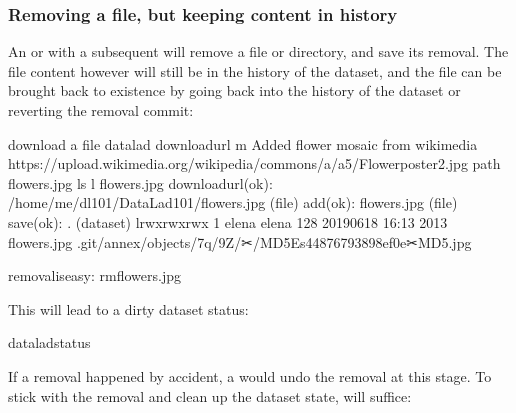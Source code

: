 \subsubsection{Removing a file, but keeping content in history}
\label{\detokenize{basics/101-136-filesystem:removing-a-file-but-keeping-content-in-history}}
\sphinxAtStartPar
An  or  with a subsequent 
will remove a file or directory, and save its removal. The file content however will
still be in the history of the dataset, and the file can be brought back to existence
by going back into the history of the dataset or reverting the removal commit:

\begin{sphinxVerbatim}[commandchars=\\\{\}]
\PYGZsh{} download a file
\PYGZdl{} datalad download\PYGZhy{}url \PYGZhy{}m \PYGZdq{}Added flower mosaic from wikimedia\PYGZdq{} \PYGZbs{}
  https://upload.wikimedia.org/wikipedia/commons/a/a5/Flower\PYGZus{}poster\PYGZus{}2.jpg \PYGZbs{}
  \PYGZhy{}\PYGZhy{}path flowers.jpg
\PYGZdl{} ls \PYGZhy{}l flowers.jpg
download\PYGZus{}url(ok): /home/me/dl\PYGZhy{}101/DataLad\PYGZhy{}101/flowers.jpg (file)
add(ok): flowers.jpg (file)
save(ok): . (dataset)
lrwxrwxrwx 1 elena elena 128 2019\PYGZhy{}06\PYGZhy{}18 16:13  2013 flowers.jpg \PYGZhy{}\PYGZgt{} .git/annex/objects/7q/9Z/✂/MD5E\PYGZhy{}s4487679\PYGZhy{}\PYGZhy{}3898ef0e✂MD5.jpg
\end{sphinxVerbatim}

\begin{sphinxVerbatim}[commandchars=\\\{\}]
removaliseasy:
rmflowers.jpg
\end{sphinxVerbatim}

\sphinxAtStartPar
This will lead to a dirty dataset status:

\begin{sphinxVerbatim}[commandchars=\\\{\}]
dataladstatus
\end{sphinxVerbatim}

\sphinxAtStartPar
If a removal happened by accident, a  would undo
the removal at this stage. To stick with the removal and clean up the dataset
state,  will suffice:

